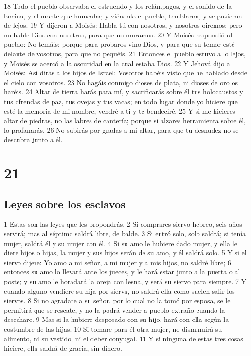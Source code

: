 18 Todo el pueblo observaba el estruendo y los relámpagos, y el sonido de la bocina, y el monte que humeaba; y viéndolo el pueblo, temblaron, y se pusieron de lejos.
19 Y dijeron a Moisés: Habla tú con nosotros, y nosotros oiremos; pero no hable Dios con nosotros, para que no muramos.
20 Y Moisés respondió al pueblo: No temáis; porque para probaros vino Dios, y para que su temor esté delante de vosotros, para que no pequéis.
21 Entonces el pueblo estuvo a lo lejos, y Moisés se acercó a la oscuridad en la cual estaba Dios.
22 Y Jehová dijo a Moisés: Así dirás a los hijos de Israel: Vosotros habéis visto que he hablado desde el cielo con vosotros.
23 No hagáis conmigo dioses de plata, ni dioses de oro os haréis.
24 Altar de tierra harás para mí, y sacrificarás sobre él tus holocaustos y tus ofrendas de paz, tus ovejas y tus vacas; en todo lugar donde yo hiciere que esté la memoria de mi nombre, vendré a ti y te bendeciré.
25 Y si me hicieres altar de piedras, no las labres de cantería; porque si alzares herramienta sobre él, lo profanarás.
26 No subirás por gradas a mi altar, para que tu desnudez no se descubra junto a él.

\chapter{21}

\section{Leyes sobre los esclavos}

1 Estas son las leyes que les propondrás.
2 Si comprares siervo hebreo, seis años servirá; mas al séptimo saldrá libre, de balde.
3 Si entró solo, solo saldrá; si tenía mujer, saldrá él y su mujer con él.
4 Si su amo le hubiere dado mujer, y ella le diere hijos o hijas, la mujer y sus hijos serán de su amo, y él saldrá solo.
5 Y si el siervo dijere: Yo amo a mi señor, a mi mujer y a mis hijos, no saldré libre;
6 entonces su amo lo llevará ante los jueces, y le hará estar junto a la puerta o al poste; y su amo le horadará la oreja con lesna, y será su siervo para siempre.
7 Y cuando alguno vendiere su hija por sierva, no saldrá ella como suelen salir los siervos.
8 Si no agradare a su señor, por lo cual no la tomó por esposa, se le permitirá que se rescate, y no la podrá vender a pueblo extraño cuando la desechare.
9 Mas si la hubiere desposado con su hijo, hará con ella según la costumbre de las hijas.
10 Si tomare para él otra mujer, no disminuirá su alimento, ni su vestido, ni el deber conyugal.
11 Y si ninguna de estas tres cosas hiciere, ella saldrá de gracia, sin dinero.

